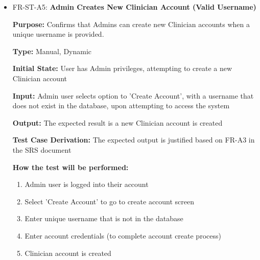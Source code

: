 \documentclass[12pt, titlepage]{article}
\begin{document}
\begin{itemize}
  \item FR-ST-A5: \textbf{Admin Creates New Clinician Account (Valid Username)}
  \begin{mdframed}[linewidth=0.5mm]
      \textbf{Purpose:} Confirms that Admins can create new Clinician accounts when a unique username is provided. \par
      \textbf{Type:} Manual, Dynamic \par
      \textbf{Initial State:} User has Admin privileges, attempting to create a new Clinician account \par
      \textbf{Input:} Admin user selects option to 'Create Account', with a username that does not exist in the database, upon attempting to access the system \par
      \textbf{Output:} The expected result is a new Clinician account is created \par
      \textbf{Test Case Derivation:} The expected output is justified based on FR-A3 in the SRS document \par
      \textbf{How the test will be performed:}
      \begin{enumerate}[noitemsep]
        \item Admin user is logged into their account
        \item Select 'Create Account' to go to create account screen
        \item Enter unique username that is not in the database
        \item Enter account credentials (to complete account create process)
        \item Clinician account is created
      \end{enumerate}
  \end{mdframed}


\end{itemize}
\end{document}
